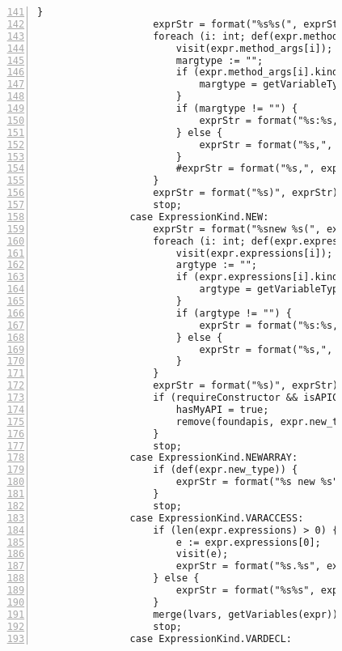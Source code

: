 \begin{figure}[ht!]
\begin{lstlisting}[numbers=left, tabsize=4, escapechar=@, caption={API Usage Mining Analysis},label={lst:aun-code},  firstline = 141, firstnumber = 141, lastline = 201]
                    }
                    exprStr = format("%s%s(", exprStr, expr.method);
                    foreach (i: int; def(expr.method_args[i])) {
                        visit(expr.method_args[i]);  
                        margtype := "";
                        if (expr.method_args[i].kind == ExpressionKind.VARACCESS) {
                            margtype = getVariableType(expr.method_args[i].variable, false);
                        }
                        if (margtype != "") {
                            exprStr = format("%s:%s,", exprStr, margtype);
                        } else {
                            exprStr = format("%s,", exprStr);    
                        }
                        #exprStr = format("%s,", exprStr);
                    }
                    exprStr = format("%s)", exprStr);
                    stop;
                case ExpressionKind.NEW:
                    exprStr = format("%snew %s(", exprStr, expr.new_type.name);
                    foreach (i: int; def(expr.expressions[i])) {
                        visit(expr.expressions[i]);  
                        argtype := "";
                        if (expr.expressions[i].kind == ExpressionKind.VARACCESS) {
                            argtype = getVariableType(expr.expressions[i].variable, false);
                        }
                        if (argtype != "") {
                            exprStr = format("%s:%s,", exprStr, argtype);
                        } else {
                            exprStr = format("%s,", exprStr);    
                        }
                    }
                    exprStr = format("%s)", exprStr);
                    if (requireConstructor && isAPIConstructor(expr.new_type.name)) {
                        hasMyAPI = true;
                        remove(foundapis, expr.new_type.name);
                    }
                    stop;
                case ExpressionKind.NEWARRAY:
                    if (def(expr.new_type)) {
                        exprStr = format("%s new %s", exprStr, expr.new_type.name);
                    }
                    stop;
                case ExpressionKind.VARACCESS:
                    if (len(expr.expressions) > 0) {
                        e := expr.expressions[0];
                        visit(e);
                        exprStr = format("%s.%s", exprStr, expr.variable);
                    } else {
                        exprStr = format("%s%s", exprStr, expr.variable);
                    }
                    merge(lvars, getVariables(expr));
                    stop;
                case ExpressionKind.VARDECL:

\end{lstlisting}
\end{figure}
